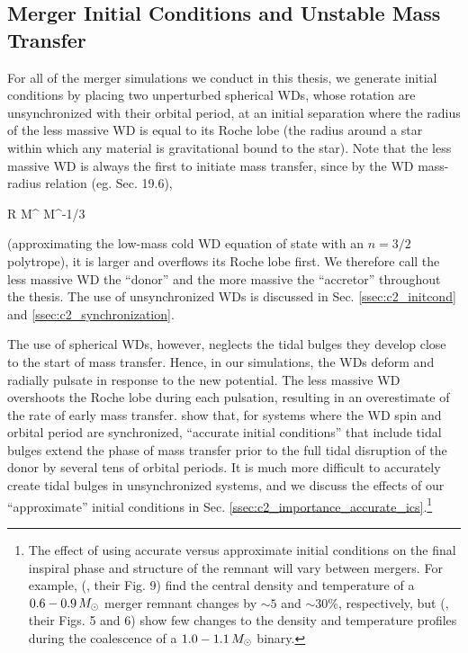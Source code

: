 \subsection{Merger Initial Conditions and Unstable Mass Transfer}
\label{ssec:c1_stable_mass_transfer}

For all of the merger simulations we conduct in this thesis, we generate initial conditions by placing two unperturbed spherical WDs, whose rotation are unsynchronized with their orbital period, at an initial separation where the radius of the less massive WD is equal to its Roche lobe (the radius around a star within which any material is gravitational bound to the star).  Note that the less massive WD is always the first to initiate mass transfer, since by the WD mass-radius relation (eg. \citealt{kippww12} Sec. 19.6),

\eqbegin
R \propto M^{} \approx M^{-1/3}
\label{eq:c1_massradiusrelation}
\eqend

\noindent (approximating the low-mass cold WD equation of state with an $n = 3/2$ polytrope), it is larger and overflows its Roche lobe first.  We therefore call the less massive WD the ``donor'' and the more massive the ``accretor'' throughout the thesis.  The use of unsynchronized WDs is discussed in Sec. \ref{ssec:c2_initcond} and \ref{ssec:c2_synchronization}.  


The use of spherical WDs, however, neglects the tidal bulges they develop close to the start of mass transfer.  Hence, in our simulations, the WDs deform and radially pulsate in response to the new potential.  The less massive WD overshoots the Roche lobe during each pulsation, resulting in an overestimate of the rate of early mass transfer.  \cite{dan+11} show that, for systems where the WD spin and orbital period are synchronized, ``accurate initial conditions'' that include tidal bulges extend the phase of mass transfer prior to the full tidal disruption of the donor by several tens of orbital periods.  It is much more difficult to accurately create tidal bulges in unsynchronized systems, and we discuss the effects of our ``approximate'' initial conditions in Sec. \ref{ssec:c2_importance_accurate_ics}.\footnote{The effect of using accurate versus approximate initial conditions on the final inspiral phase and structure of the remnant will vary between mergers.  For example, \citeauthor{dan+11} (\citeyear{dan+11}, their Fig. 9) find the central density and temperature of a $0.6-0.9\,\Msun$ merger remnant changes by $\sim5$ and $\sim30$\%, respectively, but \citeauthor{pakm+12sph} (\citeyear{pakm+12sph}, their Figs. 5 and 6) show few changes to the density and temperature profiles during the coalescence of a $1.0 - 1.1\,\Msun$ binary.}

